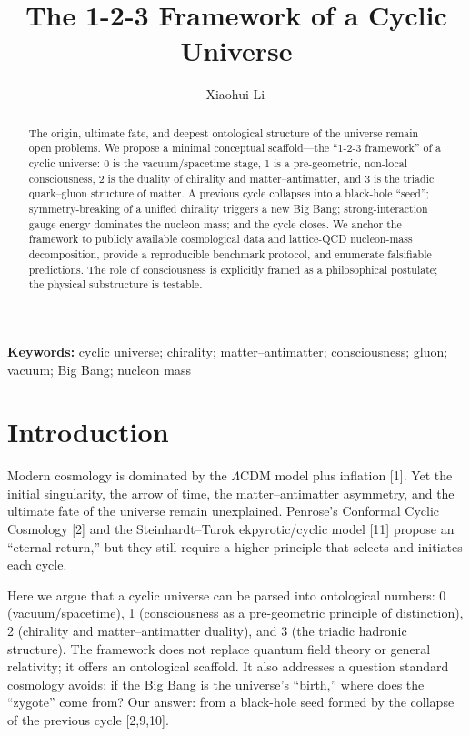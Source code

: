 \documentclass[11pt,a4paper]{article}
\title{\textbf{The 1-2-3 Framework of a Cyclic Universe}}
\author[1]{Xiaohui Li\,\orcidlink{0009-0003-8233-7191}}
\affil[1]{Independent Researcher, Baoji, China}
\affil[*]{Correspondence: Xiaohui Li (email: danceluck@163.com)}
\date{}
\begin{document}
\maketitle

\begin{abstract}
The origin, ultimate fate, and deepest ontological structure of the universe remain open problems. We propose a minimal conceptual scaffold---the ``1-2-3 framework'' of a cyclic universe: 0 is the vacuum/spacetime stage, 1 is a pre-geometric, non-local consciousness, 2 is the duality of chirality and matter--antimatter, and 3 is the triadic quark--gluon structure of matter. A previous cycle collapses into a black-hole ``seed''; symmetry-breaking of a unified chirality triggers a new Big Bang; strong-interaction gauge energy dominates the nucleon mass; and the cycle closes. We anchor the framework to publicly available cosmological data and lattice-QCD nucleon-mass decomposition, provide a reproducible benchmark protocol, and enumerate falsifiable predictions. The role of consciousness is explicitly framed as a philosophical postulate; the physical substructure is testable.
\end{abstract}

\noindent\textbf{Keywords:} cyclic universe; chirality; matter--antimatter; consciousness; gluon; vacuum; Big Bang; nucleon mass

\section{Introduction}
Modern cosmology is dominated by the $\Lambda$CDM model plus inflation [1]. Yet the initial singularity, the arrow of time, the matter--antimatter asymmetry, and the ultimate fate of the universe remain unexplained. Penrose's Conformal Cyclic Cosmology [2] and the Steinhardt--Turok ekpyrotic/cyclic model [11] propose an ``eternal return,'' but they still require a higher principle that selects and initiates each cycle.

Here we argue that a cyclic universe can be parsed into ontological numbers: 0 (vacuum/spacetime), 1 (consciousness as a pre-geometric principle of distinction), 2 (chirality and matter--antimatter duality), and 3 (the triadic hadronic structure). The framework does not replace quantum field theory or general relativity; it offers an ontological scaffold. It also addresses a question standard cosmology avoids: if the Big Bang is the universe's ``birth,'' where does the ``zygote'' come from? Our answer: from a black-hole seed formed by the collapse of the previous cycle [2,9,10].
\end{document}
